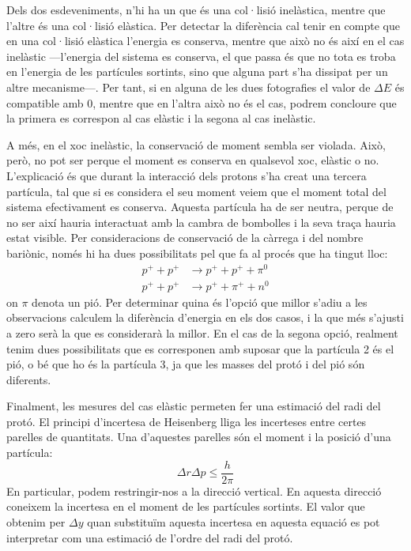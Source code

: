 \documentclass[12pt]{article}
\begin{document}
Dels dos esdeveniments, n'hi ha un que és una col·lisió inelàstica, mentre que l'altre és una col·lisió elàstica. Per detectar la diferència cal tenir en compte que en una col·lisió elàstica l'energia es conserva, mentre que això no és així en el cas inelàstic ---l'energia del sistema es conserva, el que passa és que no tota es troba en l'energia de les partícules sortints, sino que alguna part s'ha dissipat per un altre mecanisme---. Per tant, si en alguna de les dues fotografies el valor de \( \Delta E \) és compatible amb 0, mentre que en l'altra això no és el cas, podrem concloure que la primera es correspon al cas elàstic i la segona al cas inelàstic.

A més, en el xoc inelàstic, la conservació de moment sembla ser violada. Això, però, no pot ser perque el moment es conserva en qualsevol xoc, elàstic o no. L'explicació és que durant la interacció dels protons s'ha creat una tercera partícula, tal que si es considera el seu moment veiem que el moment total del sistema efectivament es conserva. Aquesta partícula ha de ser neutra, perque de no ser així hauria interactuat amb la cambra de bombolles i la seva traça hauria estat visible. Per consideracions de conservació de la càrrega i del nombre bariònic, només hi ha dues possibilitats pel que fa al procés que ha tingut lloc:
\begin{align*}
  p^{+} + p^{+} & \rightarrow p^{+} + p^{+} + \pi^{0} \\
  p^{+} + p^{+} & \rightarrow p^{+} + \pi^{+} + n^{0}
\end{align*}
on \( \pi \) denota un pió. Per determinar quina és l'opció que millor s'adiu a les observacions calculem la diferència d'energia en els dos casos, i la que més s'ajusti a zero serà la que es considerarà la millor. En el cas de la segona opció, realment tenim dues possibilitats que es corresponen amb suposar que la partícula 2 és el pió, o bé que ho és la partícula 3, ja que les masses del protó i del pió són diferents. 

Finalment, les mesures del cas elàstic permeten fer una estimació del radi del protó. El principi d'incertesa de Heisenberg lliga les incerteses entre certes parelles de quantitats. Una d'aquestes parelles són el moment i la posició d'una partícula:
\begin{equation}
  \Delta r \Delta p \leq \dfrac{h}{2\pi} 
\end{equation}
En particular, podem restringir-nos a la direcció vertical. En aquesta direcció coneixem la incertesa en el moment de les partícules sortints. El valor que obtenim per \( \Delta y \) quan substituïm aquesta incertesa en aquesta equació es pot interpretar com una estimació de l'ordre del radi del protó.
\end{document}
